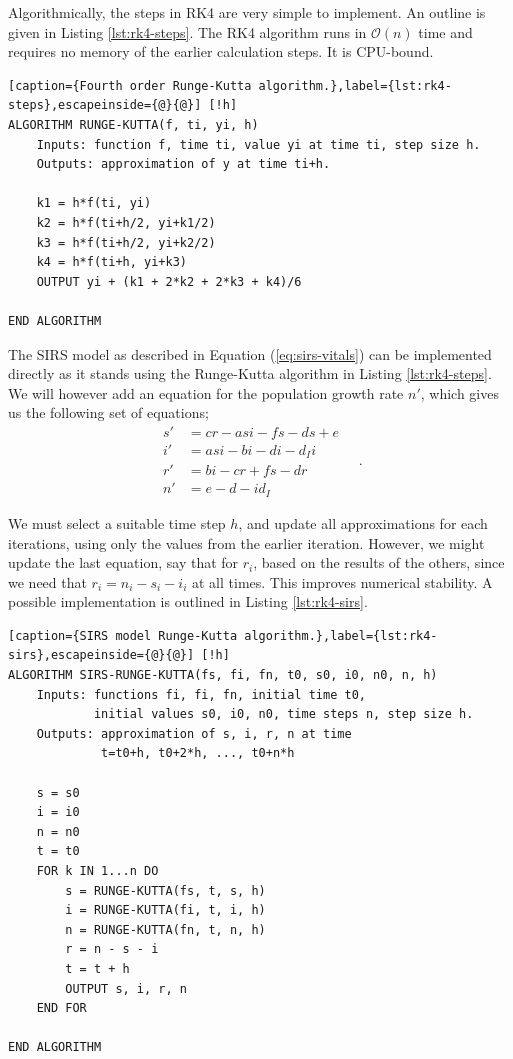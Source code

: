 \documentclass[]{article}
\begin{document}
Algorithmically, the steps in RK4 are very simple to implement. An outline is given in Listing \ref{lst:rk4-steps}. The RK4 algorithm runs in $\mathcal{O}(n)$ time and requires no memory of the earlier calculation steps. It is CPU-bound.

\begin{lstlisting}[caption={Fourth order Runge-Kutta algorithm.},label={lst:rk4-steps},escapeinside={@}{@}] [!h]
ALGORITHM RUNGE-KUTTA(f, ti, yi, h)
	Inputs: function f, time ti, value yi at time ti, step size h.
	Outputs: approximation of y at time ti+h.
	
	k1 = h*f(ti, yi)
	k2 = h*f(ti+h/2, yi+k1/2)
	k3 = h*f(ti+h/2, yi+k2/2)
	k4 = h*f(ti+h, yi+k3)
	OUTPUT yi + (k1 + 2*k2 + 2*k3 + k4)/6

END ALGORITHM
\end{lstlisting}

The SIRS model as described in Equation (\ref{eq:sirs-vitals}) can be implemented directly as it stands using the Runge-Kutta algorithm in Listing \ref{lst:rk4-steps}. We will however add an equation for the population growth rate $n'$, which gives us the following set of equations;
\begin{equation} \label{eq:sirs-rk4}
\begin{aligned}
	s' &= cr - asi - fs - ds + e \\
	i' &= asi - bi - di -d_Ii \\
	r' &= bi - cr + fs - dr \\
	n' &= e - d - id_I
\end{aligned} \quad .
\end{equation}

We must select a suitable time step $h$, and update all approximations for each iterations, using only the values from the earlier iteration. However, we might update the last equation, say that for $r_i$, based on the results of the others, since we need that $r_i = n_i - s_i - i_i$ at all times. This improves numerical stability. A possible implementation is outlined in Listing \ref{lst:rk4-sirs}.

\begin{lstlisting}[caption={SIRS model Runge-Kutta algorithm.},label={lst:rk4-sirs},escapeinside={@}{@}] [!h]
ALGORITHM SIRS-RUNGE-KUTTA(fs, fi, fn, t0, s0, i0, n0, n, h)
	Inputs: functions fi, fi, fn, initial time t0, 
			initial values s0, i0, n0, time steps n, step size h.
	Outputs: approximation of s, i, r, n at time
			 t=t0+h, t0+2*h, ..., t0+n*h
	
	s = s0
	i = i0
	n = n0
	t = t0
	FOR k IN 1...n DO
		s = RUNGE-KUTTA(fs, t, s, h)
		i = RUNGE-KUTTA(fi, t, i, h)
		n = RUNGE-KUTTA(fn, t, n, h)
		r = n - s - i
		t = t + h
		OUTPUT s, i, r, n
	END FOR

END ALGORITHM
\end{lstlisting}
\end{document}
